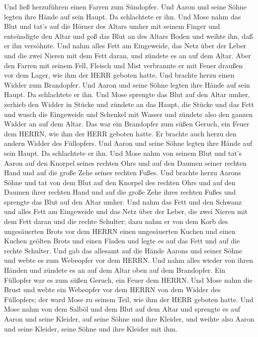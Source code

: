  Und ließ herzuführen einen Farren zum Sündopfer. Und Aaron
und seine Söhne legten ihre Hände auf sein Haupt.  Da
schlachtete er ihn. Und Mose nahm das Blut und tat's auf die Hörner des
Altars umher mit seinem Finger und entsündigte den Altar und goß das
Blut an des Altars Boden und weihte ihn, daß er ihn versöhnte.
 Und nahm alles Fett am Eingeweide, das Netz über der Leber
und die zwei Nieren mit dem Fett daran, und zündete es an auf dem Altar.
 Aber den Farren mit seinem Fell, Fleisch und Mist
verbrannte er mit Feuer draußen vor dem Lager, wie ihm der HERR geboten
hatte.  Und brachte herzu einen Widder zum Brandopfer. Und
Aaron und seine Söhne legten ihre Hände auf sein Haupt.  Da
schlachtete er ihn. Und Mose sprengte das Blut auf den Altar umher,
 zerhieb den Widder in Stücke und zündete an das Haupt, die
Stücke und das Fett  und wusch die Eingeweide und Schenkel
mit Wasser und zündete also den ganzen Widder an auf dem Altar. Das war
ein Brandopfer zum süßen Geruch, ein Feuer dem HERRN, wie ihm der HERR
geboten hatte.  Er brachte auch herzu den andern Widder des
Füllopfers. Und Aaron und seine Söhne legten ihre Hände auf sein Haupt.
 Da schlachtete er ihn. Und Mose nahm von seinem Blut und
tat's Aaron auf den Knorpel seines rechten Ohrs und auf den Daumen
seiner rechten Hand und auf die große Zehe seines rechten Fußes.
 Und brachte herzu Aarons Söhne und tat von dem Blut auf
den Knorpel des rechten Ohrs und auf den Daumen ihrer rechten Hand und
auf die große Zehe ihres rechten Fußes und sprengte das Blut auf den
Altar umher.  Und nahm das Fett und den Schwanz und alles
Fett am Eingeweide und das Netz über der Leber, die zwei Nieren mit dem
Fett daran und die rechte Schulter;  dazu nahm er von dem
Korb des ungesäuerten Brots vor dem HERRN einen ungesäuerten Kuchen und
einen Kuchen geölten Brots und einen Fladen und legte es auf das Fett
und auf die rechte Schulter.  Und gab das allesamt auf die
Hände Aarons und seiner Söhne und webte es zum Webeopfer vor dem HERRN.
 Und nahm alles wieder von ihren Händen und zündete es an
auf dem Altar oben auf dem Brandopfer. Ein Füllopfer war es zum süßen
Geruch, ein Feuer dem HERRN.  Und Mose nahm die Brust und
webte ein Webeopfer vor dem HERRN von dem Widder des Füllopfers; der
ward Mose zu seinem Teil, wie ihm der HERR geboten hatte. 
Und Mose nahm von dem Salböl und dem Blut auf dem Altar und sprengte es
auf Aaron und seine Kleider, auf seine Söhne und ihre Kleider, und
weihte also Aaron und seine Kleider, seine Söhne und ihre Kleider mit
ihm.


